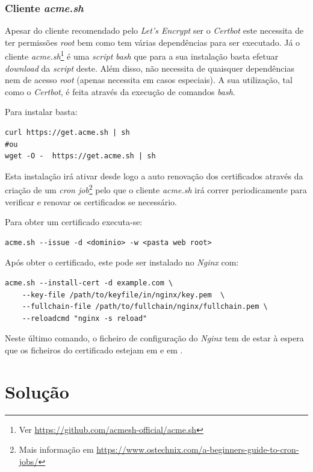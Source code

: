 \subsubsection{Cliente \textit{acme.sh}}\label{sec:soaACMEsh}
Apesar do cliente recomendado pelo \textit{Let's Encrypt} ser o \textit{Certbot} este necessita de ter permissões \textit{root} bem como tem várias dependências para ser executado. Já o cliente \textit{acme.sh}\footnote{Ver \url{https://github.com/acmesh-official/acme.sh}} é uma \textit{script} \textit{bash} que para a sua instalação basta efetuar \textit{download} da \textit{script} deste. Além disso, não necessita de quaisquer dependências nem de acesso \textit{root} (apenas necessita em casos especiais). A sua utilização, tal como o \textit{Certbot}, é feita através da execução de comandos \textit{bash}.

Para instalar basta:
\begin{lstlisting}
curl https://get.acme.sh | sh
#ou
wget -O -  https://get.acme.sh | sh
\end{lstlisting}

Esta instalação irá ativar desde logo a auto renovação dos certificados através da criação de um \textit{cron job}\footnote{Mais informação em \url{https://www.ostechnix.com/a-beginners-guide-to-cron-jobs/}} pelo que o cliente \textit{acme.sh} irá correr periodicamente para verificar e renovar os certificados se necessário.

Para obter um certificado executa-se:
\begin{lstlisting}
acme.sh --issue -d <dominio> -w <pasta web root>
\end{lstlisting}

Após obter o certificado, este pode ser instalado no \textit{Nginx} com:
\begin{lstlisting}
acme.sh --install-cert -d example.com \
    --key-file /path/to/keyfile/in/nginx/key.pem  \
    --fullchain-file /path/to/fullchain/nginx/fullchain.pem \
    --reloadcmd "nginx -s reload"
\end{lstlisting}

Neste último comando, o ficheiro de configuração do \textit{Nginx} tem de estar à espera que os ficheiros do certificado estejam em  e em .

\section{Solução}

